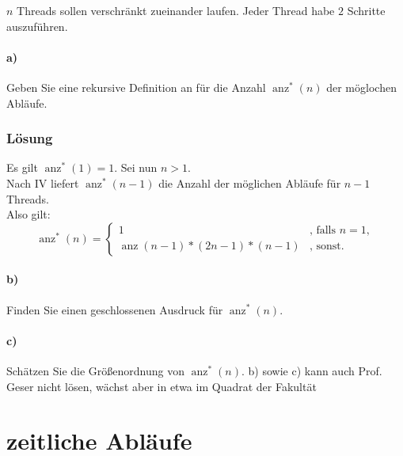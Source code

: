 \documentclass[a4paper]{scrartcl}
\DeclareMathOperator{\anz}{anz}
\begin{document}
$n $ Threads sollen verschränkt zueinander laufen. Jeder Thread habe $ 2 $ Schritte auszuführen.

\paragraph{a)} Geben Sie eine rekursive Definition an für die Anzahl $ \anz^*(n) $ der möglochen Abläufe.

\subsubsection*{Lösung}
Es gilt $ \anz^*(1) = 1 $. Sei nun $ n > 1$.\\
Nach IV liefert $ \anz^*(n-1) $ die Anzahl der möglichen Abläufe für $ n - 1 $ Threads.\\



Also gilt:\\
\begin{equation*}
\anz^*(n) = 
\begin{cases}
1 & \text{, falls } n = 1,\\
\anz(n - 1) * (2n - 1) * (n - 1) & \text{, sonst.}
\end{cases}
\end{equation*}



\paragraph{b)} Finden Sie einen geschlossenen Ausdruck für $ \anz^*(n) $.
\paragraph{c)} Schätzen Sie die Größenordnung von $ \anz^*(n) $.
b) sowie c) kann auch Prof. Geser nicht lösen, wächst aber in etwa im Quadrat der Fakultät


\section{zeitliche Abläufe}
\end{document}
